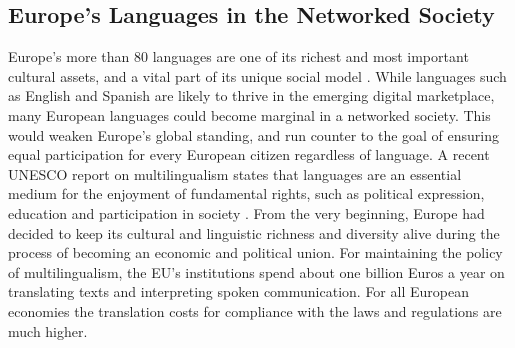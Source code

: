 \documentclass[10pt, plain]{../../metanetpaper}
\begin{document}


\begin{multicols}{2}

\subsection{Europe's Languages in the Networked Society}
\label{sec:status-europes-languages}

Europe’s more than 80 languages are one of its richest and most important cultural assets, and a vital part of its unique social model \cite{EC2,eurobarometer2012}. While languages such as English and Spanish are likely to thrive in the emerging digital marketplace, many European languages could become marginal in a networked society. This would weaken Europe’s global standing, and run counter to the goal of ensuring equal participation for every European citizen regardless of language. A recent UNESCO report on multilingualism states that languages are an essential medium for the enjoyment of fundamental rights, such as political expression, education and participation in society \cite{Unesco1}. From the very beginning, Europe had decided to keep its cultural and linguistic richness and diversity alive during the process of becoming an economic and political union. For maintaining the policy of multilingualism, the EU’s institutions spend about one billion Euros a year on translating texts and interpreting spoken communication. For all European economies the translation costs for compliance with the laws and regulations are much higher.


\end{multicols}
\end{document}
